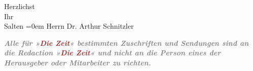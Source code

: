 \pstart
           Herzlichst {\\[\baselineskip]}Ihr {\\[\baselineskip]}\spacefill\mbox{Salten}\pend
           \leftskip=0em{}
\pstart
           \noindent{}Herrn Dr. Arthur Schnitzler\pend
           
\pstart
           \textcolor{pink}{}{}\ledrightnote{\textcolor{pink}{Wien}}\pend
           
\pstart
           \textcolor{gray}{\textbf{\emph{Alle für »\textcolor{brown}{Die Zeit}{}\ledrightnote{\textcolor{brown}{Die Zeit}}«
                        bestimmten Zuschriften und Sendungen sind an die Redaction »\textcolor{brown}{Die Zeit}{}\ledrightnote{\textcolor{brown}{Die Zeit}}« und \textbf{nicht} an die
                        Person eines der Herausgeber oder Mitarbeiter zu richten.}}}\pend
           \endnumbering{}  
      